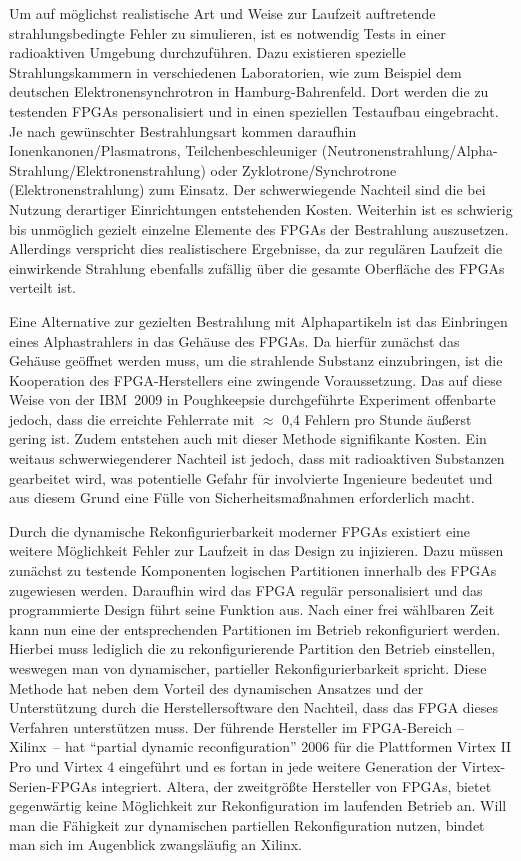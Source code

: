 Um auf möglichst realistische Art und Weise zur Laufzeit auftretende
strahlungsbedingte Fehler zu simulieren, ist es notwendig Tests in
einer radioaktiven Umgebung durchzuführen. Dazu existieren spezielle
Strahlungskammern in verschiedenen Laboratorien, wie zum Beispiel dem
deutschen Elektronensynchrotron in Hamburg-Bahrenfeld. Dort werden die
zu testenden FPGAs personalisiert und in einen speziellen Testaufbau
eingebracht. Je nach gewünschter Bestrahlungsart kommen daraufhin
Ion\-en\-ka\-no\-nen/Plas\-ma\-trons,
Teilchenbeschleuniger (Neu\-tro\-nen\-strah\-lung/Al\-pha-Strah\-lung/Elek\-tro\-nen\-strah\-lung)
oder Zy\-klo\-tro\-ne/Syn\-chro\-tro\-ne (E\-lek\-tro\-nen\-strah\-lung) zum Einsatz. Der
schwerwiegende Nachteil sind die bei Nutzung derartiger Einrichtungen
entstehenden Kosten. Weiterhin ist es schwierig bis unmöglich gezielt
einzelne Elemente des FPGAs der Bestrahlung auszusetzen. Allerdings
verspricht dies realistischere Ergebnisse, da zur regulären Laufzeit
die einwirkende Strahlung ebenfalls zufällig über die gesamte
Oberfläche des FPGAs verteilt ist.

Eine Alternative zur gezielten Bestrahlung mit Alphapartikeln ist das
Einbringen eines Alphastrahlers in das Gehäuse des FPGAs. Da hierfür
zunächst das Gehäuse geöffnet werden muss, um die strahlende Substanz
einzubringen, ist die Kooperation des FPGA-Herstellers eine zwingende
Voraussetzung. Das auf diese Weise von der IBM\TReg\ 2009 in
Poughkeepsie durchgeführte Experiment offenbarte jedoch, dass die
erreichte Fehlerrate mit $\approx$ 0,4 Fehlern pro Stunde äußerst
gering ist. Zudem entstehen auch mit dieser Methode signifikante
Kosten. Ein weitaus schwerwiegenderer Nachteil ist jedoch, dass mit
radioaktiven Substanzen gearbeitet wird, was potentielle Gefahr für
involvierte Ingenieure bedeutet und aus diesem Grund eine Fülle von
Sicherheitsmaßnahmen erforderlich macht.

Durch die dynamische Rekonfigurierbarkeit moderner FPGAs existiert
eine weitere Möglichkeit Fehler zur Laufzeit in das Design zu
injizieren. Dazu müssen zunächst zu testende Komponenten logischen
Partitionen innerhalb des FPGAs zugewiesen werden. Daraufhin wird das
FPGA regulär personalisiert und das programmierte Design führt seine
Funktion aus. Nach einer frei wählbaren Zeit kann nun eine der
entsprechenden Partitionen im Betrieb rekonfiguriert werden. Hierbei
muss lediglich die zu rekonfigurierende Partition den Betrieb
einstellen, weswegen man von dynamischer, partieller
Rekonfigurierbarkeit spricht.
Diese Methode hat neben dem Vorteil des dynamischen Ansatzes und der
Unterstützung durch die Herstellersoftware den Nachteil, dass das FPGA
dieses Verfahren unterstützen muss. Der führende Hersteller im
FPGA-Bereich -- Xilinx\TReg\ -- hat "`partial dynamic reconfiguration"'
2006 für die Plattformen Virtex II Pro und Virtex 4 eingeführt und es
fortan in jede weitere Generation der Virtex-Serien-FPGAs
integriert. Altera, der zweitgrößte Hersteller von FPGAs, bietet
gegenwärtig keine Möglichkeit zur Rekonfiguration im laufenden Betrieb
an. Will man die Fähigkeit zur dynamischen partiellen Rekonfiguration
nutzen, bindet man sich im Augenblick zwangsläufig an
Xilinx\TReg .

